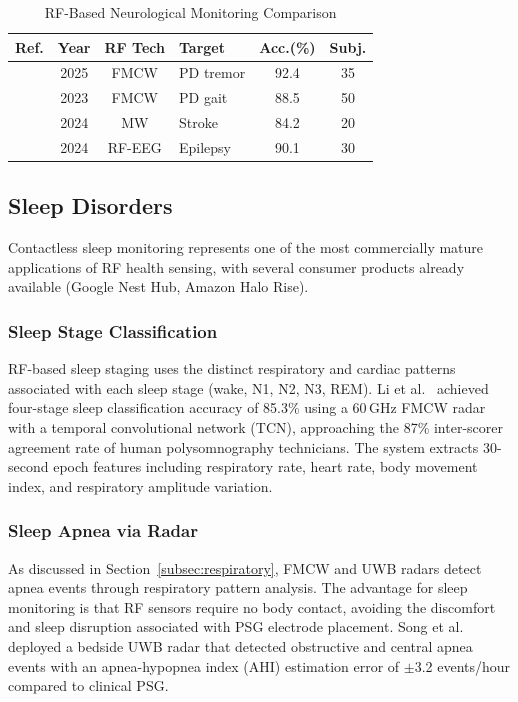 \documentclass[journal,twoside]{IEEEtran}
\begin{document}
\begin{table}[!t]
\centering
\caption{RF-Based Neurological Monitoring Comparison}
\label{tab:neuro}
\footnotesize
\setlength{\tabcolsep}{2.5pt}
\begin{tabular}{@{}L{1.2cm} c c L{1.4cm} c c@{}}
\toprule
\textbf{Ref.} & \textbf{Year} & \textbf{RF Tech} & \textbf{Target} & \textbf{Acc.(\%)} & \textbf{Subj.} \\
\midrule
\cite{ref_parkinson_review2025} & 2025 & FMCW & PD tremor & 92.4 & 35 \\
\cite{ref_parkinson_wearable2023} & 2023 & FMCW & PD gait & 88.5 & 50 \\
\cite{ref_neuro_mw2024} & 2024 & MW & Stroke & 84.2 & 20 \\
\cite{ref_eeg_wearable2024} & 2024 & RF-EEG & Epilepsy & 90.1 & 30 \\
\bottomrule
\end{tabular}
\end{table}

\subsection{Sleep Disorders}
\label{subsec:sleep}

Contactless sleep monitoring represents one of the most commercially mature applications of RF health sensing, with several consumer products already available (Google Nest Hub, Amazon Halo Rise).

\subsubsection{Sleep Stage Classification}
RF-based sleep staging uses the distinct respiratory and cardiac patterns associated with each sleep stage (wake, N1, N2, N3, REM). Li et al.~\cite{ref_sleep_fmcw2024} achieved four-stage sleep classification accuracy of 85.3\% using a 60\,GHz FMCW radar with a temporal convolutional network (TCN), approaching the 87\% inter-scorer agreement rate of human polysomnography technicians. The system extracts 30-second epoch features including respiratory rate, heart rate, body movement index, and respiratory amplitude variation.

\subsubsection{Sleep Apnea via Radar}
As discussed in Section~\ref{subsec:respiratory}, FMCW and UWB radars detect apnea events through respiratory pattern analysis. The advantage for sleep monitoring is that RF sensors require no body contact, avoiding the discomfort and sleep disruption associated with PSG electrode placement. Song et al.~\cite{ref_sleep_uwb2023} deployed a bedside UWB radar that detected obstructive and central apnea events with an apnea-hypopnea index (AHI) estimation error of $\pm$3.2 events/hour compared to clinical PSG.
\end{document}

